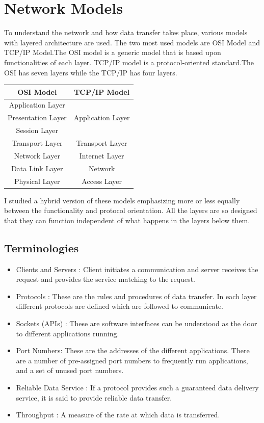 \documentclass{article}
\begin{document}
\section{Network Models}
To understand the network and how data transfer takes place, various models with layered architecture are used. The two most used models are OSI Model and TCP/IP Model.The OSI model is a generic model that is based upon functionalities of each layer. TCP/IP model is a protocol-oriented standard.The OSI has seven layers while the TCP/IP has four layers.
    \begin{center}
        \begin{tabular}{|c|c|}
            \hline
             \textbf{OSI Model} & \textbf{TCP/IP Model}\\
            \hline
            Application Layer & \\ \cline{1-1}
            Presentation Layer & Application Layer\\ \cline{1-1}
            Session Layer& \\ 
            \hline
            Transport Layer & Transport Layer\\
            \hline
            Network Layer & Internet Layer\\
            \hline
            Data Link Layer  & Network\\ \cline{1-1}
            Physical Layer & Access Layer\\
            \hline
            
        \end{tabular}
    \end{center}
I studied a hybrid version of these models emphasizing more or less equally between the functionality and protocol orientation. All the layers are so designed that they can function independent of what happens in the layers below them.

\subsection{Terminologies}
\begin{itemize}
    \item Clients and Servers : Client initiates a communication and server receives the request and provides the service matching to the request.
    \item Protocols : These are the rules and procedures of data transfer. In each layer different protocols are defined which are followed to communicate. 
    \item Sockets (APIs) : These are software interfaces can be understood as the door to different applications running.
    \item Port Numbers: These are the addresses of the different applications. There are a number of pre-assigned port numbers to frequently run applications, and a set of unused port numbers.
    \item Reliable Data Service : If a protocol provides such a guaranteed data delivery service, it is said to provide reliable data transfer.
    \item Throughput : A measure of the rate at which data is transferred.
\end{itemize}
\end{document}
